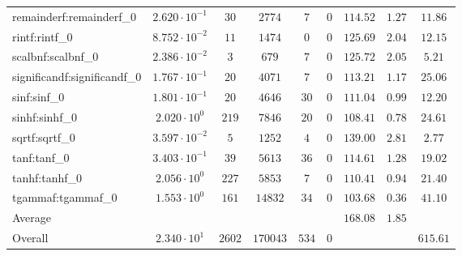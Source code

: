 \begin{tabular}{|l|c|c|c|c|c|c|c|c|}
remainderf:remainderf\_0     & $ 2.620 \cdot 10^{-1} $ & $ 30     $ & $ 2774   $ & $ 7   $ & $ 0   $ & $ 114.52      $ & $ 1.27    $ & $ 11.86   $ \\
rintf:rintf\_0               & $ 8.752 \cdot 10^{-2} $ & $ 11     $ & $ 1474   $ & $ 0   $ & $ 0   $ & $ 125.69      $ & $ 2.04    $ & $ 12.15   $ \\
scalbnf:scalbnf\_0           & $ 2.386 \cdot 10^{-2} $ & $ 3      $ & $ 679    $ & $ 7   $ & $ 0   $ & $ 125.72      $ & $ 2.05    $ & $ 5.21    $ \\
significandf:significandf\_0 & $ 1.767 \cdot 10^{-1} $ & $ 20     $ & $ 4071   $ & $ 7   $ & $ 0   $ & $ 113.21      $ & $ 1.17    $ & $ 25.06   $ \\
sinf:sinf\_0                 & $ 1.801 \cdot 10^{-1} $ & $ 20     $ & $ 4646   $ & $ 30  $ & $ 0   $ & $ 111.04      $ & $ 0.99    $ & $ 12.20   $ \\
sinhf:sinhf\_0               & $ 2.020 \cdot 10^{0}  $ & $ 219    $ & $ 7846   $ & $ 20  $ & $ 0   $ & $ 108.41      $ & $ 0.78    $ & $ 24.61   $ \\
sqrtf:sqrtf\_0               & $ 3.597 \cdot 10^{-2} $ & $ 5      $ & $ 1252   $ & $ 4   $ & $ 0   $ & $ 139.00      $ & $ 2.81    $ & $ 2.77    $ \\
tanf:tanf\_0                 & $ 3.403 \cdot 10^{-1} $ & $ 39     $ & $ 5613   $ & $ 36  $ & $ 0   $ & $ 114.61      $ & $ 1.28    $ & $ 19.02   $ \\
tanhf:tanhf\_0               & $ 2.056 \cdot 10^{0}  $ & $ 227    $ & $ 5853   $ & $ 7   $ & $ 0   $ & $ 110.41      $ & $ 0.94    $ & $ 21.40   $ \\
tgammaf:tgammaf\_0           & $ 1.553 \cdot 10^{0}  $ & $ 161    $ & $ 14832  $ & $ 34  $ & $ 0   $ & $ 103.68      $ & $ 0.36    $ & $ 41.10   $ \\
\hline
Average                      & $                     $ & $        $ & $        $ & $     $ & $     $ & $ 168.08      $ & $ 1.85    $ & $         $ \\
\hline
Overall                      & $ 2.340 \cdot 10^{1}  $ & $ 2602   $ & $ 170043 $ & $ 534 $ & $ 0   $ & $             $ & $         $ & $ 615.61  $ \\
\hline
\end{tabular}
